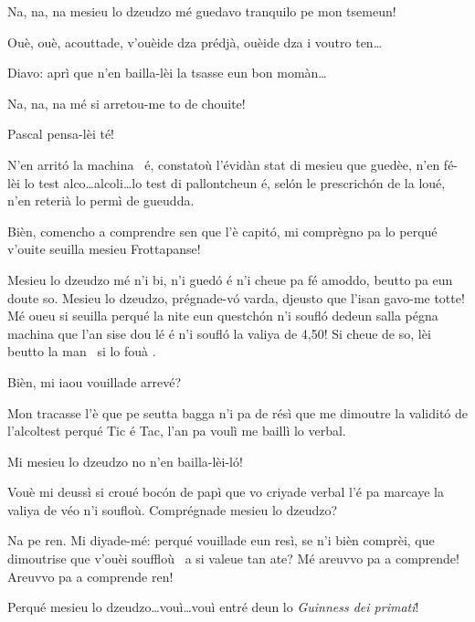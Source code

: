 \begin{drama}
\Cienspeaks Na, na, na mesieu lo dzeudzo mé guedavo tranquilo pe mon tsemeun!

\DzeudzoSenliquerspeaks {}  Ouè, ouè, acouttade, v'ou\-èi\-de dza prédjà, ouèide dza i  voutro ten\ldots

\Ticspeaks Diavo: aprì que n’en bailla-lèi la tsasse eun bon momàn\ldots

\Cienspeaks Na, na, na mé si arretou-me to de chouite!

\DzeudzoSenliquerspeaks {}  Pascal pensa-lèi té!


\Ticspeaks N’en arritó la machina \machina\ é, constatoù l’évidàn stat di mesieu que guedèe, n’en fé-lèi lo test alco\ldots alcoli\ldots lo test di pallon\-tcheun é, selón le prescrichón de la loué, n’en reterià lo permì de gueudda.

\DzeudzoSenliquerspeaks Bièn, comencho a comprendre sen que l'è capitó, mi comprègno pa lo perqué v'ouite seuilla mesieu Frottapanse!

\Cienspeaks Mesieu lo dzeudzo mé n’i bi, n’i guedó é n’i cheue pa fé amoddo, beutto pa eun doute so. Mesieu lo dzeudzo, prégnade-v\'o varda, djeusto que l'isan gavo-me totte! Mé oueu si seuilla perqué la nite eun questchón n’i soufló dedeun salla pégna machina que l’an sise dou lé é n’i soufló la valiya de 4,50! Si cheue de so, lèi beutto la man \man\ si lo fouà \foua.

\DzeudzoSenliquerspeaks Bièn, mi iaou vouillade arrevé?

\Cienspeaks Mon tracasse l’è que pe seutta bagga n’i pa de résì que me dimoutre la validitó de l'alcoltest perqué Tic é Tac, l’an pa voulì me baillì lo verbal.

\Ticspeaks Mi mesieu lo dzeudzo no n’en bailla-lèi-l\'o!

\Cienspeaks Vouè mi deussì si croué bocón de papì que vo cri\-ya\-de verbal l'é pa marcaye la valiya de véo n’i soufloù. Comprégnade mesieu lo dzeudzo?

\DzeudzoSenliquerspeaks Na pe ren. Mi diyade-mé: perqué vouillade eun resì, se n’i bièn comprèi, que dimoutrise que v'ouèi souffloù \soffiare\ a si valeue tan ate? Mé areuvvo pa a comprende! Areuvvo pa a comprende ren!

\Cienspeaks Perqué mesieu lo dzeudzo\ldots vouì\ldots vouì entré deun lo  \textit{Guinness dei primati}!


\end{drama}
